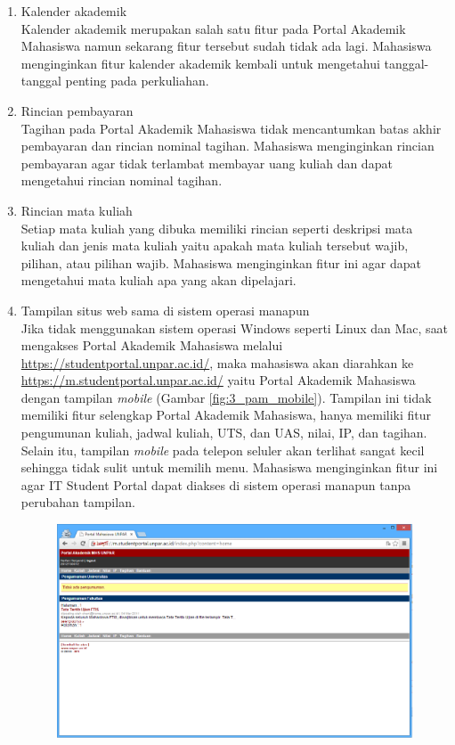 \documentclass[a4paper,twoside]{article}
\begin{document}
\begin{enumerate}
\begin{enumerate}
	\item Kalender akademik\\
	Kalender akademik merupakan salah satu fitur pada Portal Akademik Mahasiswa namun sekarang fitur tersebut sudah tidak ada lagi. Mahasiswa menginginkan fitur kalender akademik kembali untuk mengetahui tanggal-tanggal penting pada perkuliahan. 
	\item Rincian pembayaran\\
	Tagihan pada Portal Akademik Mahasiswa tidak mencantumkan batas akhir pembayaran dan rincian nominal tagihan. Mahasiswa menginginkan rincian pembayaran agar tidak terlambat membayar uang kuliah dan dapat mengetahui rincian nominal tagihan.
	\item Rincian mata kuliah\\
	Setiap mata kuliah yang dibuka memiliki rincian seperti deskripsi mata kuliah dan jenis mata kuliah yaitu apakah mata kuliah tersebut wajib, pilihan, atau pilihan wajib. Mahasiswa menginginkan fitur ini agar dapat mengetahui mata kuliah apa yang akan dipelajari.
	\item Tampilan situs web sama di sistem operasi manapun\\
	Jika tidak menggunakan sistem operasi Windows seperti Linux dan Mac, saat mengakses Portal Akademik Mahasiswa melalui \url{https://studentportal.unpar.ac.id/}, maka mahasiswa akan diarahkan ke \url{https://m.studentportal.unpar.ac.id/} yaitu Portal Akademik Mahasiswa dengan tampilan \textit{mobile} (Gambar \ref{fig:3_pam_mobile}). Tampilan ini tidak memiliki fitur selengkap Portal Akademik Mahasiswa, hanya memiliki fitur pengumunan kuliah, jadwal kuliah, UTS, dan UAS, nilai, IP, dan tagihan. Selain itu, tampilan \textit{mobile} pada telepon seluler akan terlihat sangat kecil sehingga tidak sulit untuk memilih menu. Mahasiswa menginginkan fitur ini agar IT Student Portal dapat diakses di sistem operasi manapun tanpa perubahan tampilan.
	\begin{figure}[H]
			\centering
			\includegraphics[scale=0.5]{Gambar/pam-mobile}

\end{figure}
\end{enumerate}
\end{enumerate}
\end{document}
